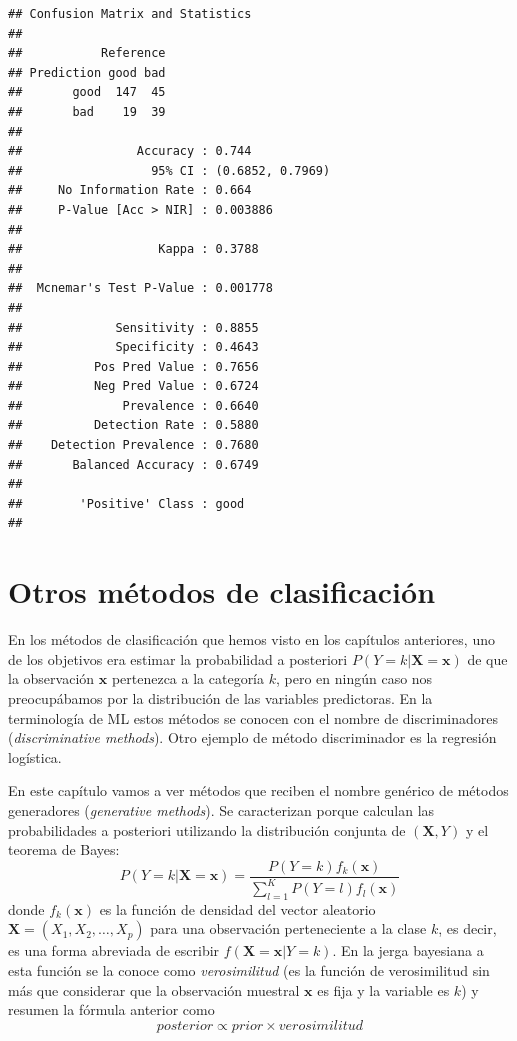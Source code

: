 \documentclass[
  spanish,
]{book}
\theoremstyle{break}
\theoremstyle{definition}
\theoremstyle{definition}
\theoremstyle{definition}
\theoremstyle{definition}
\theoremstyle{remark}
\begin{document}
\begin{verbatim}
## Confusion Matrix and Statistics
## 
##           Reference
## Prediction good bad
##       good  147  45
##       bad    19  39
##                                           
##                Accuracy : 0.744           
##                  95% CI : (0.6852, 0.7969)
##     No Information Rate : 0.664           
##     P-Value [Acc > NIR] : 0.003886        
##                                           
##                   Kappa : 0.3788          
##                                           
##  Mcnemar's Test P-Value : 0.001778        
##                                           
##             Sensitivity : 0.8855          
##             Specificity : 0.4643          
##          Pos Pred Value : 0.7656          
##          Neg Pred Value : 0.6724          
##              Prevalence : 0.6640          
##          Detection Rate : 0.5880          
##    Detection Prevalence : 0.7680          
##       Balanced Accuracy : 0.6749          
##                                           
##        'Positive' Class : good            
## 
\end{verbatim}

\hypertarget{class-otros}{%
\chapter{Otros métodos de clasificación}\label{class-otros}}

En los métodos de clasificación que hemos visto en los capítulos anteriores, uno de los objetivos era estimar la probabilidad a posteriori \(P(Y = k | \mathbf{X}=\mathbf{x})\) de que la observación \(\mathbf{x}\) pertenezca a la categoría \(k\), pero en ningún caso nos preocupábamos por la distribución de las variables predictoras. En la terminología de ML estos métodos se conocen con el nombre de discriminadores (\emph{discriminative methods}). Otro ejemplo de método discriminador es la regresión logística.

En este capítulo vamos a ver métodos que reciben el nombre genérico de métodos generadores (\emph{generative methods}). Se caracterizan porque calculan las probabilidades a posteriori utilizando la distribución conjunta de \((\mathbf{X}, Y)\) y el teorema de Bayes:
\[P(Y = k | \mathbf{X}=\mathbf{x}) = \frac{P(Y = k) f_k(\mathbf{x})}{\sum_{l=1}^K P(Y = l) f_l(\mathbf{x})}\]
donde \(f_k(\mathbf{x})\) es la función de densidad del vector aleatorio \(\mathbf{X}=(X_1, X_2, \ldots, X_p)\) para una observación perteneciente a la clase \(k\), es decir, es una forma abreviada de escribir \(f(\mathbf{X}=\mathbf{x} | Y = k)\). En la jerga bayesiana a esta función se la conoce como \emph{verosimilitud} (es la función de verosimilitud sin más que considerar que la observación muestral \(\mathbf{x}\) es fija y la variable es \(k\)) y resumen la fórmula anterior como
\[posterior \propto prior \times verosimilitud\]
\end{document}

